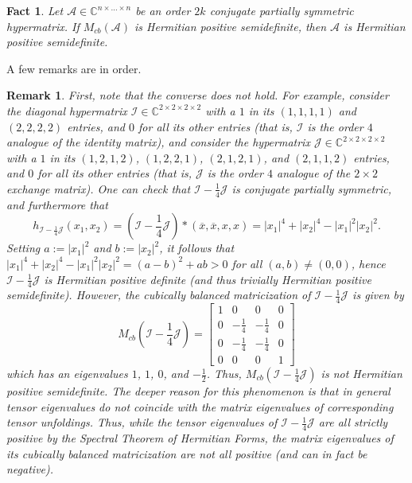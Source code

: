 \documentclass[11pt]{article}
\newtheorem{fact}[theorem]{Fact}
\newtheorem{remark}[theorem]{Remark}
\begin{document}
\begin{fact}\label{Sufficient Condition for Hermitian Positive Semidefiniteness}
    Let $\mathcal{A}\in \mathbb{C}^{n\times\dots\times n}$ be an order $2k$ conjugate partially symmetric hypermatrix. If $M_{cb}(\mathcal{A})$ is Hermitian positive semidefinite, then $\mathcal{A}$ is Hermitian positive semidefinite. 
\end{fact}
A few remarks are in order. 
\begin{remark}
    First, note that the converse does not hold. For example, consider the diagonal hypermatrix $\mathcal{I}\in \mathbb{C}^{2\times 2\times 2\times 2}$ with a $1$ in its $(1,1,1,1)$ and $(2,2,2,2)$ entries, and $0$ for all its other entries (that is, $\mathcal{I}$ is the order $4$ analogue of the identity matrix), and consider the hypermatrix $\mathcal{J}\in \mathbb{C}^{2\times 2\times 2\times 2}$ with a $1$ in its $(1,2,1,2)$, $(1,2,2,1)$, $(2,1,2,1)$, and $(2,1,1,2)$ entries, and $0$ for all its other entries (that is, $\mathcal{J}$ is the order $4$ analogue of the $2\times 2$ exchange matrix). One can check that $\mathcal{I}-\frac{1}{4}\mathcal{J}$ is conjugate partially symmetric, and furthermore that 
    \[h_{\mathcal{I}-\frac{1}{4}\mathcal{J}}(x_1,x_2) = \left(\mathcal{I}-\frac{1}{4}\mathcal{J}\right)*(\overline{x},\overline{x},x,x) = |x_1|^4+|x_2|^4-|x_1|^2|x_2|^2.\]
    Setting $a := |x_1|^2$ and $b := |x_2|^2$, it follows that $|x_1|^4+|x_2|^4-|x_1|^2|x_2|^2 = (a-b)^2+ab>0$ for all $(a,b)\neq (0,0)$, hence $\mathcal{I}-\frac{1}{4}\mathcal{J}$ is Hermitian positive definite (and thus trivially Hermitian positive semidefinite). However, the cubically balanced matricization of $\mathcal{I}-\frac{1}{4}\mathcal{J}$ is given by 
    \[M_{cb}\left(\mathcal{I}-\frac{1}{4}\mathcal{J}\right) = \left[\begin{array}{cccc}
        1 & 0 & 0 & 0 \\
        0 & -\frac{1}{4} & -\frac{1}{4} & 0 \\
        0 & -\frac{1}{4} & -\frac{1}{4} & 0 \\
        0 & 0 & 0 & 1
    \end{array}\right]\]
    which has an eigenvalues $1$, $1$, $0$, and $-\frac{1}{2}$. Thus, $M_{cb}\left(\mathcal{I}-\frac{1}{4}\mathcal{J}\right)$ is not Hermitian positive semidefinite. The deeper reason for this phenomenon is that in general tensor eigenvalues do not coincide with the matrix eigenvalues of corresponding tensor unfoldings. Thus, while the tensor eigenvalues of $\mathcal{I}-\frac{1}{4}\mathcal{J}$ are all strictly positive by the Spectral Theorem of Hermitian Forms, the matrix eigenvalues of its cubically balanced matricization are not all positive (and can in fact be negative). 
\end{remark} 
\end{document}
